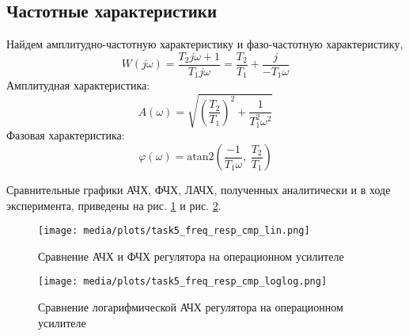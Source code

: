 \FloatBarrier
\subsection{Частотные характеристики}
\noindent Найдем амплитудно-частотную характеристику и фазо-частотную характеристику,
\begin{equation}
    W(j\omega) = \frac{T_2j\omega + 1}{T_1j\omega} = \frac{T_2}{T_1} + \frac{j}{-T_1\omega}
\end{equation}
Амплитудная характеристика:
\begin{equation}
    A(\omega) = \sqrt{\left(\frac{T_2}{T_1}\right)^2 + \frac{1}{T_1^2\omega^2}}
\end{equation}
Фазовая характеристика:
\begin{equation}
    \varphi(\omega) = \text{atan2}\left(\frac{-1}{T_1\omega},~\frac{T_2}{T_1}\right)
\end{equation}

Сравнительные графики АЧХ, ФЧХ, ЛАЧХ, полученных аналитически и в ходе эксперимента, приведены на рис. \ref{fig:task5_freq_resp_cmp_lin} и рис. \ref{fig:task5_freq_resp_cmp_loglog}.
\begin{figure}[ht!]
    \centering
    \texttt{[image: media/plots/task5\_freq\_resp\_cmp\_lin.png]}
    \caption{Сравнение АЧХ и ФЧХ регулятора на операционном усилителе}
    \label{fig:task5_freq_resp_cmp_lin}
\end{figure}
\begin{figure}[ht!]
    \centering
    \texttt{[image: media/plots/task5\_freq\_resp\_cmp\_loglog.png]}
    \caption{Сравнение логарифмической АЧХ регулятора на операционном усилителе}
    \label{fig:task5_freq_resp_cmp_loglog}
\end{figure}